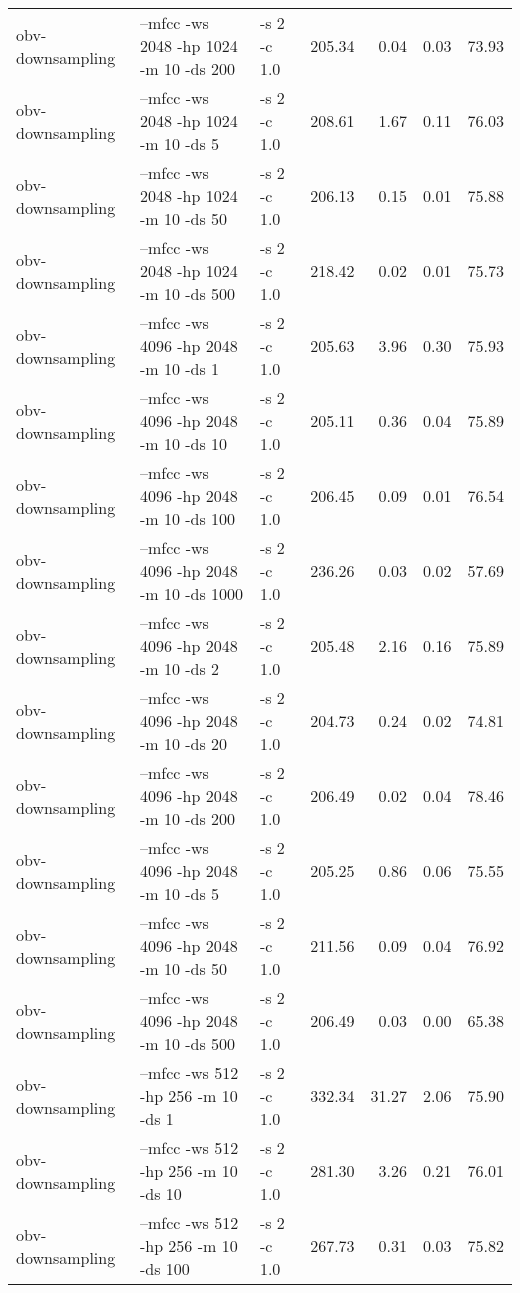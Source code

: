 \documentclass[11pt,a4paper]{article}
\begin{document}
\begin{tabular}{lllrrrr}
 obv-downsampling  &  --mfcc -ws 2048 -hp 1024 -m 10 -ds 200   &  -s 2 -c 1.0  &  205.34  &   0.04  &  0.03  &  73.93  \\
 obv-downsampling  &  --mfcc -ws 2048 -hp 1024 -m 10 -ds 5     &  -s 2 -c 1.0  &  208.61  &   1.67  &  0.11  &  76.03  \\
 obv-downsampling  &  --mfcc -ws 2048 -hp 1024 -m 10 -ds 50    &  -s 2 -c 1.0  &  206.13  &   0.15  &  0.01  &  75.88  \\
 obv-downsampling  &  --mfcc -ws 2048 -hp 1024 -m 10 -ds 500   &  -s 2 -c 1.0  &  218.42  &   0.02  &  0.01  &  75.73  \\
 obv-downsampling  &  --mfcc -ws 4096 -hp 2048 -m 10 -ds 1     &  -s 2 -c 1.0  &  205.63  &   3.96  &  0.30  &  75.93  \\
 obv-downsampling  &  --mfcc -ws 4096 -hp 2048 -m 10 -ds 10    &  -s 2 -c 1.0  &  205.11  &   0.36  &  0.04  &  75.89  \\
 obv-downsampling  &  --mfcc -ws 4096 -hp 2048 -m 10 -ds 100   &  -s 2 -c 1.0  &  206.45  &   0.09  &  0.01  &  76.54  \\
 obv-downsampling  &  --mfcc -ws 4096 -hp 2048 -m 10 -ds 1000  &  -s 2 -c 1.0  &  236.26  &   0.03  &  0.02  &  57.69  \\
 obv-downsampling  &  --mfcc -ws 4096 -hp 2048 -m 10 -ds 2     &  -s 2 -c 1.0  &  205.48  &   2.16  &  0.16  &  75.89  \\
 obv-downsampling  &  --mfcc -ws 4096 -hp 2048 -m 10 -ds 20    &  -s 2 -c 1.0  &  204.73  &   0.24  &  0.02  &  74.81  \\
 obv-downsampling  &  --mfcc -ws 4096 -hp 2048 -m 10 -ds 200   &  -s 2 -c 1.0  &  206.49  &   0.02  &  0.04  &  78.46  \\
 obv-downsampling  &  --mfcc -ws 4096 -hp 2048 -m 10 -ds 5     &  -s 2 -c 1.0  &  205.25  &   0.86  &  0.06  &  75.55  \\
 obv-downsampling  &  --mfcc -ws 4096 -hp 2048 -m 10 -ds 50    &  -s 2 -c 1.0  &  211.56  &   0.09  &  0.04  &  76.92  \\
 obv-downsampling  &  --mfcc -ws 4096 -hp 2048 -m 10 -ds 500   &  -s 2 -c 1.0  &  206.49  &   0.03  &  0.00  &  65.38  \\
 obv-downsampling  &  --mfcc -ws 512 -hp 256 -m 10 -ds 1       &  -s 2 -c 1.0  &  332.34  &  31.27  &  2.06  &  75.90  \\
 obv-downsampling  &  --mfcc -ws 512 -hp 256 -m 10 -ds 10      &  -s 2 -c 1.0  &  281.30  &   3.26  &  0.21  &  76.01  \\
 obv-downsampling  &  --mfcc -ws 512 -hp 256 -m 10 -ds 100     &  -s 2 -c 1.0  &  267.73  &   0.31  &  0.03  &  75.82  \\

\end{tabular}
\end{document}
